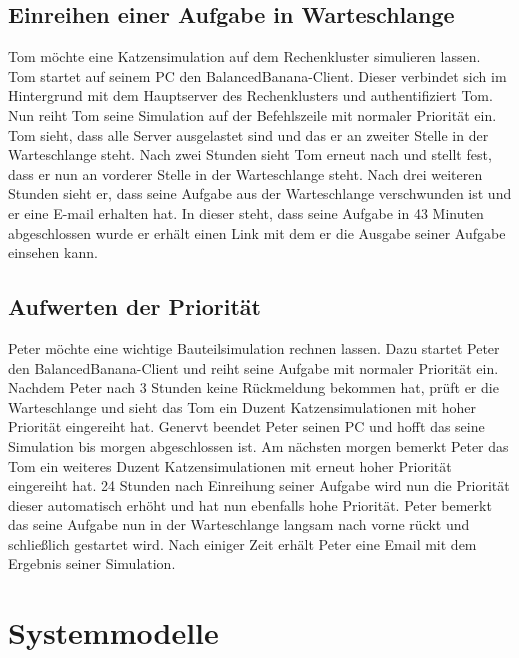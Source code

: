 \documentclass[a4paper,12pt]{article}
\begin{document}
\subsection{\textbf{Einreihen einer Aufgabe in Warteschlange}}
Tom möchte eine Katzensimulation auf dem Rechenkluster simulieren lassen. %
Tom startet auf seinem PC den BalancedBanana-Client. Dieser verbindet sich im Hintergrund mit dem Hauptserver des Rechenklusters und authentifiziert Tom.
Nun reiht Tom seine Simulation auf der Befehlszeile mit normaler Priorität ein.
Tom sieht, dass alle Server ausgelastet sind und das er an zweiter Stelle in der Warteschlange steht.
Nach zwei Stunden sieht Tom erneut nach und stellt fest, dass er nun an vorderer Stelle in der Warteschlange steht.
Nach drei weiteren Stunden sieht er, dass seine Aufgabe aus der Warteschlange verschwunden ist und er eine E-mail erhalten hat.
In dieser steht, dass seine Aufgabe in 43 Minuten abgeschlossen wurde er erhält einen Link mit dem er die Ausgabe seiner Aufgabe einsehen kann.

\subsection{\textbf{Aufwerten der Priorität}}
Peter möchte eine wichtige Bauteilsimulation rechnen lassen.
Dazu startet Peter den BalancedBanana-Client und reiht seine Aufgabe mit normaler Priorität ein.
Nachdem Peter nach 3 Stunden keine Rückmeldung bekommen hat, prüft er die Warteschlange und sieht das Tom ein Duzent Katzensimulationen mit hoher Priorität eingereiht hat.
Genervt beendet Peter seinen PC und hofft das seine Simulation bis morgen abgeschlossen ist.
Am nächsten morgen bemerkt Peter das Tom ein weiteres Duzent Katzensimulationen mit erneut hoher Priorität eingereiht hat.
24 Stunden nach Einreihung seiner Aufgabe wird nun die Priorität dieser automatisch erhöht und hat nun ebenfalls hohe Priorität.
Peter bemerkt das seine Aufgabe nun in der Warteschlange langsam nach vorne rückt und schließlich gestartet wird. 
Nach einiger Zeit erhält Peter eine Email mit dem Ergebnis seiner Simulation.

\section{Systemmodelle}
\end{document}
